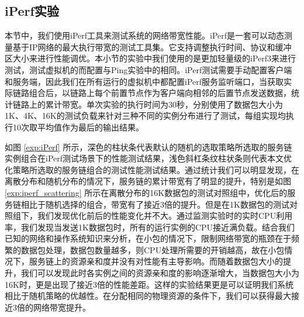 \subsection{iPerf实验}
本节中，我们使用iPerf工具来测试系统的网络带宽性能。iPerf是一套可以动态测量基于IP网络的最大执行带宽的测试工具集。它支持调整执行时间、协议和缓冲区大小来进行性能调优。本小节的实验中我们使用的是更加轻量级的iPerf3来进行测试，测试虚拟机的而配置与Ping实验中的相同。iPerf测试需要手动配置客户端和服务端，因此我们在所有运行的虚拟机中都配置iPerf服务监听端口，当获取实际链路组合后，以链路上每个前置节点作为客户端向相邻的后置节点发送数据，统计链路上的累计带宽。单次实验的执行时间为30秒，分别使用了数据包大小为1K、4K、16K的测试负载来针对三种不同的实例分布进行了测试，每组实现均执行10次取平均值作为最后的输出结果。
\begin{figure}[!htp]
	\centering
\end{figure}
\begin{figure}
	\addtocounter{subfigure}{2}
	\ContinuedFloat
	\centering
\end{figure}

如图 \ref{exp:iPerf} 所示，深色的柱状条代表默认的随机的选取策略所选取的服务链实例组合在iPerf测试场景下的性能测试结果，浅色斜杠条纹柱状条则代表本文优化策略所选取的服务链组合的测试性能测试结果。通过统计我们可以明显发现，在离散分布和随机分布的情况下，服务链的累计带宽有了明显的提升，特别是如图 \ref{exp:iperf_scattering} 所示在离散分布的16K数据包的测试对照组中，优化后的服务链相比于随机选择的组合，带宽有了接近3倍的提升。但是在1K数据包的测试对照组下，我们发现优化前后的性能变化并不大。通过监测实验时的实时CPU利用率，我们发现当发送1K数据包时，所有的运行实例的CPU接近满负载。结合我们已知的网络和操作系统知识来分析，在小包的情况下，限制网络带宽的瓶颈在于频繁的数据包处理，数据包数量越多，则CPU处理所需要的开销越高，故在小包情况下，服务链上的资源亲和度并没有对性能有主导影响。而随着数据包大小的提升，我们可以发现此时各实例之间的资源亲和度的影响逐渐增大，当数据包大小为16K时，更是出现了接近3倍的性能差距。这样的实验结果更是可以证明我们系统相比于随机策略的优越性。在分配相同的物理资源的条件下，我们可以获得最大接近3倍的网络带宽提升。

